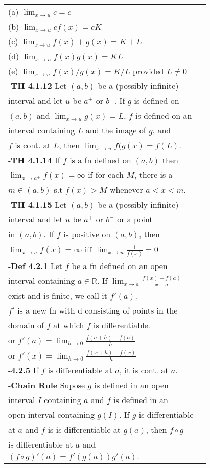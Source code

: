 \documentclass[10 pt,landscape]{article}
\begin{document}
\begin{multicols}{4}
\begin{tabular}{@{}ll@{}}
(a) $\lim_{x \to u} c=c$\\
(b) $\lim_{x \to u} cf(x)=cK$\\
(c) $\lim_{x \to u} f(x)+g(x)=K+L$\\
(d) $\lim_{x \to u} f(x)g(x)=KL$\\
(e) $\lim_{x \to u} f(x)/g(x)=K/L$ provided $L \neq 0$\\
-\textbf{TH 4.1.12} Let $(a,b)$ be a (possibly infinite) \\interval and let $u$ be $a^{+}$ or $b^{-}$. If $g$ is defined on\\ $(a,b)$ and $\lim_{x \to u} g(x)=L$, $f$ is defined on an\\ interval containing $L$ and the image of $g$, and\\ $f$ is cont. at $L$, then $\lim_{x \to u} f(g(x)=f(L)$.\\
-\textbf{TH 4.1.14} If $f$ is a fn defined on $(a,b)$ then \\$\lim_{x \to a^{+}} f(x)= \infty $ if for each $M$, there is a \\ $m \in (a,b)$ s.t $f(x)>M$ whenever $a<x<m$.\\
-\textbf{TH 4.1.15} Let $(a,b)$ be a (possibly  infinite) \\interval and let $u$ be $a^{+}$ or $b^{-}$ or a point \\in $(a,b)$. If $f$ is positive on $(a,b)$, then\\ $\lim_{x \to u} f(x)= \infty $ iff  $\lim_{x \to u} \frac{1}{f(x)}= 0 $\\
-\textbf{Def 4.2.1} Let $f$ be a fn defined on an open \\interval containing $a \in \mathbb{R}$. If  $\lim_{x \to a} \frac{f(x)-f(a)}{x-a}$ \\ exist and is finite, we call it $f'(a)$.\\
$f'$ is a new fn with d consisting of points in the\\ domain of $f$ at which $f$ is differentiable.\\
or $f'(a)= \lim_{h \to 0} \frac{f(a+h)-f(a)}{h}$\\
or $f'(x)= \lim_{h \to 0} \frac{f(x+h)-f(x)}{h}$\\
-\textbf{4.2.5} If $f$ is differentiable at $a$, it is cont. at $a$.\\
-\textbf{Chain Rule} Supose $g$ is defined in an open\\ interval $I$ containing $a$ and $f$ is defined in an \\ open interval containing $g(I)$. If $g$ is differentiable\\ at $a$ and $f$ is is differentiable at $g(a)$, then $f \circ g$ \\ is differentiable at $a$ and  \\ $(f \circ g)'(a)=f'(g(a))g'(a).$\\


\end{tabular}
\end{multicols}
\end{document}
